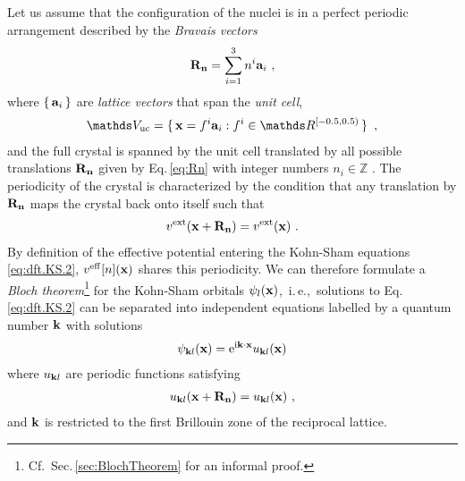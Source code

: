 Let us assume that the configuration of the nuclei is in a perfect periodic arrangement described by the 
\emph{Bravais vectors}
\begin{align}
	{\bf R}_{\bf n} 
		= \sum_{i=1}^{3} n^i {\bf a}_i~,
	\label{eq:Rn}
\end{align}
where $\set{{\bf a}_i}$ are \emph{lattice vectors} that span the \emph{unit cell},
\begin{align}
	\mathds V_{\rm uc}
		= \set{{\bf x} = f^i {\bf a}_i : f^i \in \mathds R^{[-0.5, 0.5)}}~,
	\label{eq:dft.Bloch.unitcell}
\end{align}
and the full crystal is spanned by the unit cell translated by all possible translations $\bf R_n$ given by Eq.\,\eqref{eq:Rn} with integer numbers $n_i \in \mathds Z$ .
The periodicity of the crystal is characterized by the condition that any translation by $\bf R_n$ maps the crystal back onto itself such that
\begin{align}
	v^{\rm ext} ({\bf x} + {\bf R_n}) 
		= v^{\rm ext} ({\bf x})~.
	\label{eq:dft.Bloch.1}
\end{align}
By definition of the effective potential entering the Kohn-Sham equations \eqref{eq:dft.KS.2}, $v^{\rm eff} [n] ({\bf x})$ shares this periodicity. We can therefore formulate a \emph{Bloch theorem}\footnote{Cf.~Sec.\,\ref{sec:BlochTheorem} for an informal proof.}
for the Kohn-Sham orbitals $\psi_l ({\bf x})$,~i.\,e.,~solutions to Eq.\,\eqref{eq:dft.KS.2} can be separated into independent equations labelled by a quantum number $\bf k$ with solutions
\begin{align}
	\psi_{{\bf k} l} ({\bf x}) 
		= {\rm e}^{\im {\bf k} \cdot {\bf x}} u_{{\bf k} l} ({\bf x})
	\label{eq:dft.Bloch.2}
\end{align}
where $u_{{\bf k} l}$ are periodic functions satisfying
\begin{align}
	u_{{\bf k} l} ({\bf x} + {\bf R_n})
		= u_{{\bf k} l} ({\bf x})~,
	\label{eq:dft.Bloch.3}
\end{align}
and $\bf k$ is restricted to the first Brillouin zone of the reciprocal lattice.

